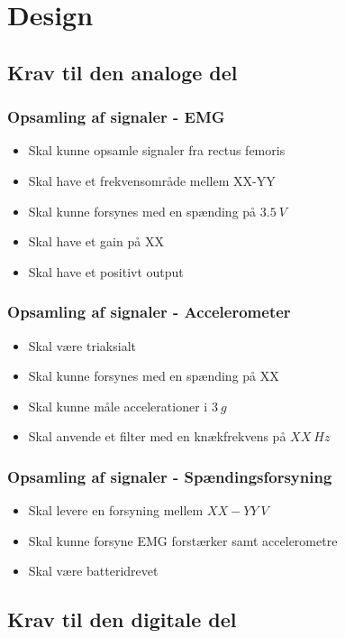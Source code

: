 \section{Design}

\subsection{Krav til den analoge del}

\subsubsection{Opsamling af signaler - EMG}
\begin{itemize}
\item Skal kunne opsamle signaler fra rectus femoris
\item Skal have et frekvensområde mellem XX-YY
\item Skal kunne forsynes med en spænding på \pm $3.5~V$ 
\item Skal have et gain på XX
\item Skal have et positivt output
\end{itemize}

\subsubsection{Opsamling af signaler - Accelerometer}
\begin{itemize}
\item Skal være triaksialt 
\item Skal kunne forsynes med en spænding på XX
\item Skal kunne måle accelerationer i \pm $3~g$
\item Skal anvende et filter med en knækfrekvens på $XX~Hz$
\end{itemize}

\subsubsection{Opsamling af signaler - Spændingsforsyning}
\begin{itemize}
\item Skal levere en forsyning mellem $XX-YY~V$
\item Skal kunne forsyne EMG forstærker samt accelerometre 
\item Skal være batteridrevet
\end{itemize}

\subsection{Krav til den digitale del}


